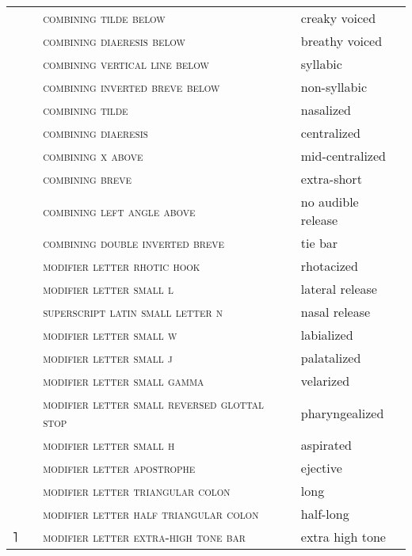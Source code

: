 \begin{center}
\begin{xtabular}{ l L{1.1cm} L{6.2cm} L{3.6cm} }
 &  & \textsc{combining tilde below} & creaky voiced \\
 &  & \textsc{combining diaeresis below} & breathy voiced \\
 &  & \textsc{combining vertical line below} & syllabic \\
 &  & \textsc{combining inverted breve below} & non-syllabic \\
 &  & \textsc{combining tilde} & nasalized \\
 &  & \textsc{combining diaeresis} & centralized \\
 &  & \textsc{combining x above} & mid-centralized \\
 &  & \textsc{combining breve} & extra-short \\
 &  & \textsc{combining left angle above} & no audible release \\
 &  & \textsc{combining double inverted breve} & tie bar \\
 &  & \textsc{modifier letter rhotic hook} & rhotacized \\
 &  & \textsc{modifier letter small l} & lateral release \\
 &  & \textsc{superscript latin small letter n} & nasal release \\
 &  & \textsc{modifier letter small w} & labialized \\
 &  & \textsc{modifier letter small j} & palatalized \\
 &  & \textsc{modifier letter small gamma} & velarized \\
 &  & \textsc{modifier letter small reversed glottal stop} & pharyngealized \\
 &  & \textsc{modifier letter small h} & aspirated \\
 &  & \textsc{modifier letter apostrophe} & ejective \\
 &  & \textsc{modifier letter triangular colon} & long \\
 &  & \textsc{modifier letter half triangular colon} & half-long \\{˥} &  & \textsc{modifier letter extra-high tone bar} & extra high tone \\

\end{xtabular}
\end{center}
